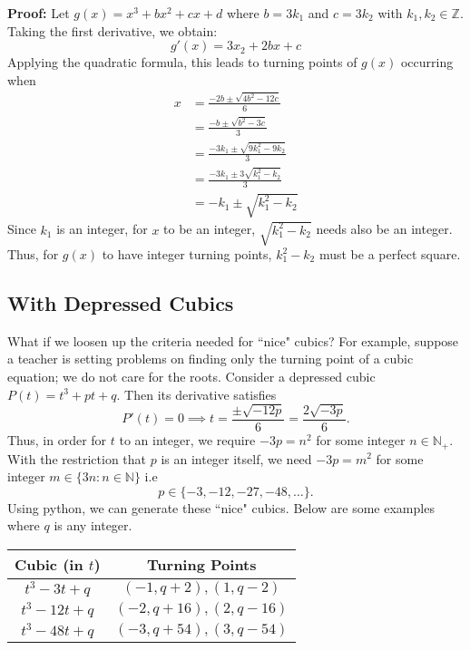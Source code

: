 \documentclass[12pt]{article}
\newcommand{\N}{\mathbb{N}}
\begin{document}
\textbf{Proof:} Let $g(x) = x^3 + bx^2 + cx + d$ where $b = 3k_1$ and $c = 3k_2$ with $k_1, k_2 \in \mathbb{Z}$. Taking the first derivative, we obtain:
$$g'(x) = 3x_2 + 2bx + c$$
Applying the quadratic formula, this leads to turning points of $g(x)$ occurring when
\begin{align*}
    x &= \frac{-2b \pm \sqrt{4b^2 - 12c}}{6} \\
    &= \frac{-b \pm \sqrt{b^2 - 3c}}{3} \\
    &= \frac{-3k_1 \pm \sqrt{9k_1^2 - 9k_2}}{3} \\
    &= \frac{-3k_1 \pm 3 \sqrt{k_1^2 - k_2}}{3} \\
    &= -k_1 \pm \sqrt{k_1^2 - k_2}
\end{align*}
Since $k_1$ is an integer, for $x$ to be an integer, $\sqrt{k_1^2 - k_2}$ needs also be an integer. Thus, for $g(x)$ to have integer turning points, $k_1^2 - k_2$ must be a perfect square.

\subsection{With Depressed Cubics}
What if we loosen up the criteria needed for ``nice" cubics? For example, suppose a teacher is setting problems on finding only the turning point of a cubic equation; we do not care for the roots. Consider a depressed cubic $P(t) = t^3 + pt + q$. Then its derivative satisfies
\begin{equation*}
    P'(t) = 0 \implies t = \frac{\pm \sqrt{-12p}}{6} = \frac{2\sqrt{-3p}}{6}.
\end{equation*}
Thus, in order for $t$ to an integer, we require $-3p = n^2$ for some integer $n \in \N_+$. With the restriction that $p$ is an integer itself, we need $-3p = m^2$ for some integer $m \in \{3n : n \in \N\}$ i.e
\begin{equation*}
    p \in \{-3, -12, -27, -48, \dots\}.
\end{equation*}
Using python, we can generate these ``nice" cubics. Below are some examples where $q$ is any integer.
\begin{center}
\begin{tabular}{c|c}
Cubic (in $t$) & Turning Points\\
\hline 
$t^3 - 3t + q$ & $(-1, q + 2), (1, q - 2)$\\
$t^3 - 12t + q$ & $(-2, q + 16), (2, q - 16)$\\
$t^3 - 48t + q$ & $(-3, q + 54), (3, q - 54)$
\end{tabular}
\end{center}
\end{document}
